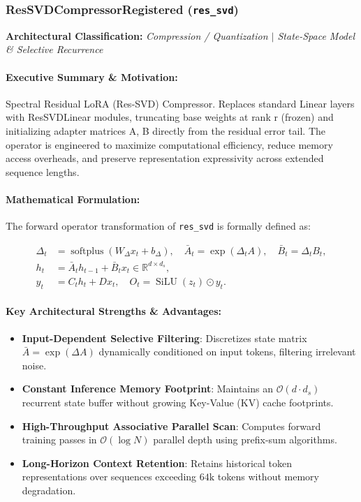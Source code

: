 \subsubsection{ResSVDCompressorRegistered (\texttt{res\_svd})}
\label{sec:module_res\_svd}

\textbf{Architectural Classification:} \textit{Compression / Quantization $\mid$ State-Space Model & Selective Recurrence}

\paragraph{Executive Summary \& Motivation:}
Spectral Residual LoRA (Res-SVD) Compressor.  Replaces standard Linear layers with ResSVDLinear modules, truncating base weights at rank r (frozen) and initializing adapter matrices A, B directly from the residual error tail. The operator is engineered to maximize computational efficiency, reduce memory access overheads, and preserve representation expressivity across extended sequence lengths.

\paragraph{Mathematical Formulation:}
The forward operator transformation of \texttt{res\_svd} is formally defined as:

\begin{align}
\Delta_t &= \operatorname{softplus}(W_\Delta x_t + b_\Delta), \quad \bar{A}_t = \exp(\Delta_t A), \quad \bar{B}_t = \Delta_t B_t, \\
h_t &= \bar{A}_t h_{t-1} + \bar{B}_t x_t \in \mathbb{R}^{d \times d_s}, \\
y_t &= C_t h_t + D x_t, \quad O_t = \operatorname{SiLU}(z_t) \odot y_t.
\end{align}


\paragraph{Key Architectural Strengths \& Advantages:}
\begin{itemize}
    \item \textbf{Input-Dependent Selective Filtering}: Discretizes state matrix $\bar{A} = \exp(\Delta A)$ dynamically conditioned on input tokens, filtering irrelevant noise.
    \item \textbf{Constant Inference Memory Footprint}: Maintains an $\mathcal{O}(d \cdot d_s)$ recurrent state buffer without growing Key-Value (KV) cache footprints.
    \item \textbf{High-Throughput Associative Parallel Scan}: Computes forward training passes in $\mathcal{O}(\log N)$ parallel depth using prefix-sum algorithms.
    \item \textbf{Long-Horizon Context Retention}: Retains historical token representations over sequences exceeding $64\text{k}$ tokens without memory degradation.
\end{itemize}

